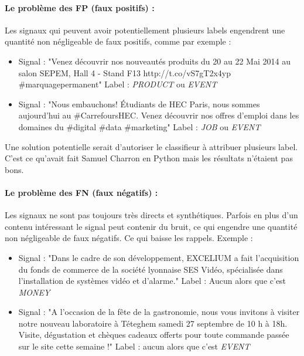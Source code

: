                 \paragraph{Le problème des FP (faux positifs) :}
                    Les signaux qui peuvent avoir potentiellement plusieurs labels engendrent une quantité non négligeable de faux positifs, comme par exemple :
                    \begin{itemize}
                        \item Signal : "Venez découvrir nos nouveautés produits du 20 au 22 Mai 2014 au salon SEPEM, Hall 4 - Stand F13 http://t.co/vS7gT2x4yp \#marquagepermanent" Label : \textit{PRODUCT} ou \textit{EVENT}
                        \item Signal : "Nous embauchons! Étudiants de HEC Paris, nous sommes aujourd'hui au \#CarrefoursHEC. Venez découvrir nos offres d'emploi dans les domaines du \#digital \#data \#marketing" Label : \textit{JOB} ou \textit{EVENT}
                    \end{itemize}
                    Une solution potentielle serait d'autoriser le classifieur à attribuer plusieurs label. C'est ce qu'avait fait Samuel Charron en Python mais les résultats n'étaient pas bons.

                \paragraph{Le problème des FN (faux négatifs) :}
                    Les signaux ne sont pas toujours très directs et synthétiques. Parfois en plus d'un contenu intéressant le signal peut contenir du bruit, ce qui engendre une quantité non négligeable de faux négatifs. Ce qui baisse les rappels. Exemple :
                    \begin{itemize}
                        \item Signal : "Dans le cadre de son développement, EXCELIUM a fait l'acquisition du fonds de commerce de la société lyonnaise SES Vidéo, spécialisée dans l'installation de systèmes vidéo et d'alarme." Label : Aucun alors que c'est \textit{MONEY}
                        \item Signal : "A l'occasion de la fête de la gastronomie, nous vous invitons à visiter notre nouveau laboratoire à Téteghem samedi 27 septembre de 10 h à 18h. Visite, dégustation et chèques cadeaux offerts pour toute commande passée sur le site cette semaine !" Label : aucun alors que c'est \textit{EVENT}
                    \end{itemize}

